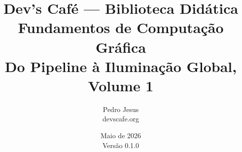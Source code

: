 \title{
  {\large Dev's Café — Biblioteca Didática} \\[1em]
  {\Huge \textbf{Fundamentos de Computação Gráfica}} \\[0.5em]
  {\large Do Pipeline à Iluminação Global, Volume 1}
}
\author{Pedro Jesus \\ \small devscafe.org}
\date{Maio de 2026 \\ \small Versão 0.1.0}
